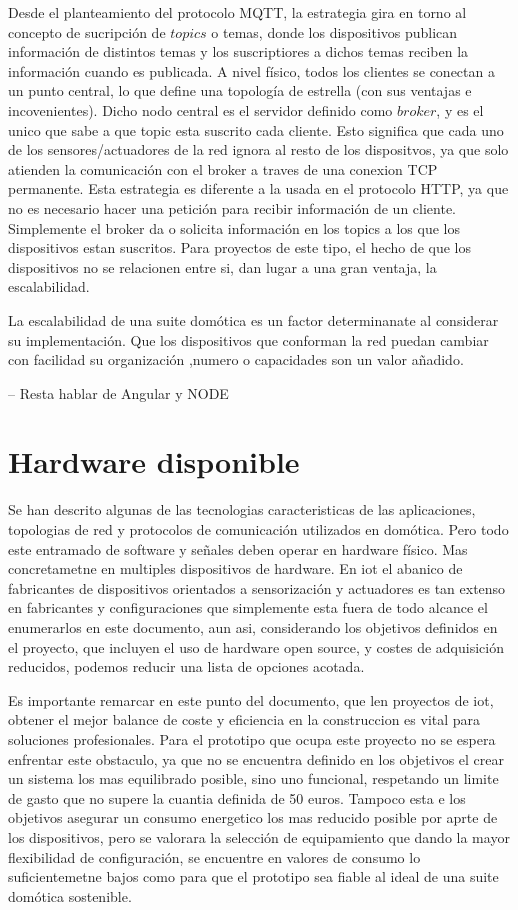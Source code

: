 Desde el planteamiento del protocolo MQTT, la estrategia gira en torno al concepto de sucripción de $topics$ o temas, donde los dispositivos publican información de distintos temas y los suscriptiores a dichos temas reciben la información cuando es publicada. A nivel físico, todos los clientes se conectan a un punto central, lo que define una topología de estrella (con sus ventajas e incovenientes). Dicho nodo central es el servidor definido como $broker$, y es el unico que sabe a que topic esta suscrito cada cliente. Esto significa que cada uno de los sensores/actuadores de la red ignora al resto de los dispositvos, ya que solo atienden la comunicación con el broker a traves de una conexion TCP permanente. Esta estrategia es diferente a la usada en el protocolo HTTP, ya que no es necesario hacer una petición para recibir información de un cliente. Simplemente el broker da o solicita información en los topics a los que los dispositivos estan suscritos. Para proyectos de este tipo, el hecho de que los dispositivos no se relacionen entre si, dan lugar a una gran ventaja, la escalabilidad.

La escalabilidad de una suite domótica es un factor determinanate al considerar su implementación. Que los dispositivos que conforman la red puedan cambiar con facilidad su organización ,numero o capacidades son un valor añadido.


-- Resta hablar de Angular y NODE

\section{Hardware disponible}
\label{ch:Capitulo2.3}

Se han descrito algunas de las tecnologias caracteristicas de las aplicaciones, topologias de red y protocolos de comunicación utilizados en domótica. Pero todo este entramado de software y señales deben operar en hardware físico. Mas concretametne en multiples dispositivos de hardware. En \gls{iot} el abanico de fabricantes de dispositivos orientados a sensorización y actuadores es tan extenso en fabricantes y configuraciones que simplemente esta fuera de todo alcance el enumerarlos en este documento, aun asi, considerando los objetivos definidos en el proyecto, que incluyen el uso de hardware open source, y costes de adquisición reducidos, podemos reducir una lista de opciones acotada.

Es importante remarcar en este punto del documento, que len proyectos de \gls{iot}, obtener el mejor balance de coste y eficiencia en la construccion es vital para soluciones profesionales. Para el prototipo que ocupa este proyecto no se espera enfrentar este obstaculo, ya que no se encuentra definido en los objetivos el crear un sistema los mas equilibrado posible, sino uno funcional, respetando un limite de gasto que no supere la cuantia definida de 50 euros. Tampoco esta e los objetivos asegurar un consumo energetico los mas reducido posible por aprte de los dispositivos, pero se valorara la selección de equipamiento que dando la mayor flexibilidad de configuración, se encuentre en valores de consumo lo suficientemetne bajos como para que el prototipo sea fiable al ideal de una suite domótica sostenible.

